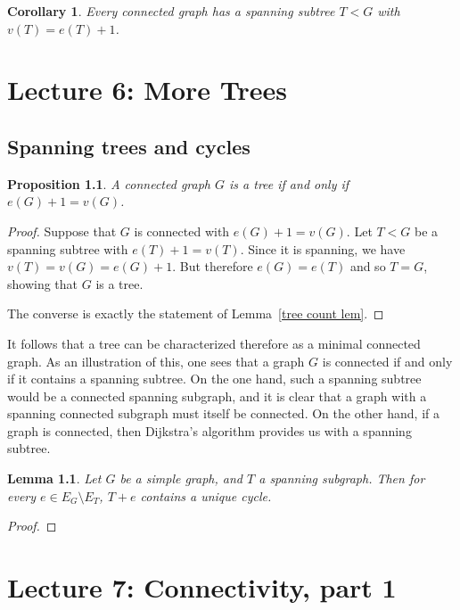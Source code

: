 \documentclass[12pt]{report}
\theoremstyle{plain}
\newtheorem{lem}[thm]{Lemma}
\newtheorem{cor}[thm]{Corollary}
\newtheorem{prop}[thm]{Proposition}
\begin{document}
\begin{cor}
Every connected graph has a spanning subtree $T < G$ with $v(T) = e(T) +
1$.
\end{cor}

\chapter{Lecture 6: More Trees}

\section{Spanning trees and cycles}

\begin{prop}
A connected graph $G$ is a tree if and only if $e(G) + 1 = v(G)$.
\end{prop}
\begin{proof}
Suppose that $G$ is connected with $e(G) + 1 = v(G)$.
Let $T < G$ be a spanning subtree with $e(T) + 1 = v(T)$. Since it is
spanning, we have $v(T) = v(G) = e(G) + 1$. But therefore $e(G) = e(T)$ and
so $T = G$, showing that $G$ is a tree.

The converse is exactly the statement of Lemma~\ref{tree count lem}.
\end{proof}

It follows that a tree can be characterized therefore as a minimal
connected graph. As an illustration of this, one sees that a graph $G$ is
connected if and only if it contains a spanning subtree. On the one hand,
such a spanning subtree would be a connected spanning subgraph, and it is
clear that a graph with a spanning connected subgraph must itself be
connected. On the other hand, if a graph is connected, then Dijkstra's
algorithm provides us with a spanning subtree.

\begin{lem}
Let $G$ be a simple graph, and $T$ a spanning subgraph. Then for every $e
\in E_G \setminus E_T$, $T + e$ contains a unique cycle.
\end{lem}
\begin{proof}

\end{proof}

\chapter{Lecture 7: Connectivity, part 1} \label{chap:connectivity}
\end{document}
